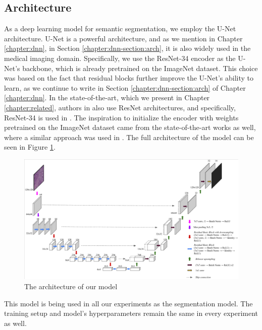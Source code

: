 \subsection{Architecture}
As a deep learning model for semantic segmentation, we employ the U-Net architecture. U-Net is a powerful architecture, and as we mention in Chapter \ref{chapter:dnn}, in Section \ref{chapter:dnn-section:arch}, it is also widely used in the medical imaging domain. Specifically, we use the ResNet-34 encoder as the U-Net's backbone, which is already pretrained on the ImageNet dataset. This choice was based on the fact that residual blocks further improve the U-Net's ability to learn, as we continue to write in Section \ref{chapter:dnn-section:arch} of Chapter \ref{chapter:dnn}. In the state-of-the-art, which we present in Chapter \ref{chapter:related}, authors in \cite{Zhang2022, Liang2023} also use ResNet architectures, and specifically, ResNet-34 is used in \cite{Lin2023}. The inspiration to initialize the encoder with weights pretrained on the ImageNet dataset came from the state-of-the-art works as well, where a similar approach was used in \cite{Zhang2022, Lin2023, Liang2023}. The full architecture of the model can be seen in Figure \ref{fig:our-architecture}.

\begin{figure}[H]
\begin{centering}
\includegraphics[width=\textwidth]{assets/images/for_presentation/our_architecture.png}
\par\end{centering}
\caption{The architecture of our model 
\label{fig:our-architecture}}
\end{figure}

This model is being used in all our experiments as the segmentation model. The training setup and model's hyperparameters remain the same in every experiment as well. 


